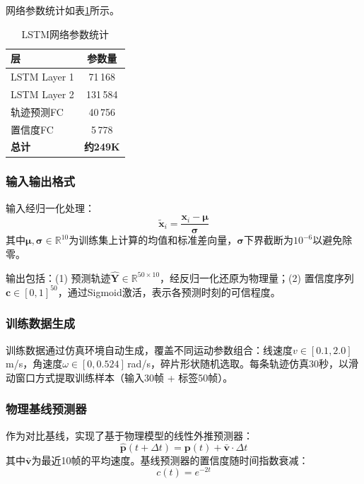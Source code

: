 \documentclass[12pt,a4paper]{ctexart}
\begin{document}
网络参数统计如表\ref{tab:lstm}所示。

\begin{table}[H]
\centering
\caption{LSTM网络参数统计}
\label{tab:lstm}
\begin{tabular}{lc}
\toprule
层 & 参数量 \\
\midrule
LSTM Layer 1 & 71\,168 \\
LSTM Layer 2 & 131\,584 \\
轨迹预测FC   & 40\,756 \\
置信度FC     & 5\,778 \\
\midrule
\textbf{总计} & \textbf{约249K} \\
\bottomrule
\end{tabular}
\end{table}

\subsubsection{输入输出格式}

输入经归一化处理：
\begin{equation}
  \tilde{\mathbf{x}}_i = \frac{\mathbf{x}_i - \boldsymbol{\mu}}{\boldsymbol{\sigma}}
\end{equation}
其中$\boldsymbol{\mu}, \boldsymbol{\sigma} \in \mathbb{R}^{10}$为训练集上计算的均值和标准差向量，$\boldsymbol{\sigma}$下界截断为$10^{-6}$以避免除零。

输出包括：(1) 预测轨迹$\hat{\mathbf{Y}} \in \mathbb{R}^{50 \times 10}$，经反归一化还原为物理量；(2) 置信度序列$\mathbf{c} \in [0,1]^{50}$，通过Sigmoid激活，表示各预测时刻的可信程度。

\subsubsection{训练数据生成}

训练数据通过仿真环境自动生成，覆盖不同运动参数组合：线速度$v \in [0.1, 2.0]$\,m/s，角速度$\omega \in [0, 0.524]$\,rad/s，碎片形状随机选取。每条轨迹仿真30秒，以滑动窗口方式提取训练样本（输入30帧 + 标签50帧）。

\subsubsection{物理基线预测器}

作为对比基线，实现了基于物理模型的线性外推预测器\cite{aghili2012}：
\begin{equation}
  \hat{\mathbf{p}}(t+\Delta t) = \mathbf{p}(t) + \bar{\mathbf{v}} \cdot \Delta t
\end{equation}
其中$\bar{\mathbf{v}}$为最近10帧的平均速度。基线预测器的置信度随时间指数衰减：
\begin{equation}
  c(t) = e^{-2t}
\end{equation}
\end{document}
